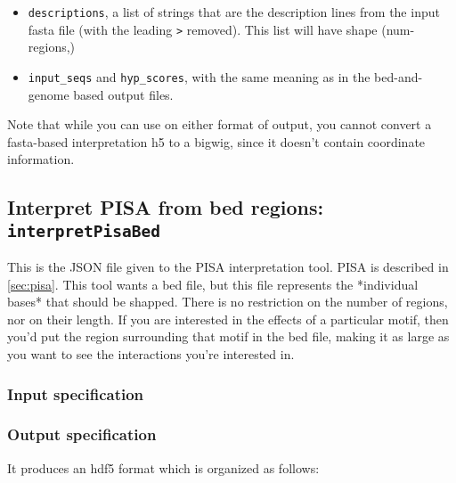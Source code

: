 \documentclass{article}
\begin{document}
\begin{itemize}
    \item \texttt{descriptions}, a list of strings that are the description
        lines from the input fasta file (with the leading \texttt{>} removed).
        This list will have shape (num-regions,)
    \item \texttt{input\_seqs} and \texttt{hyp\_scores}, with the same meaning
        as in the bed-and-genome based output files.
\end{itemize}

Note that while you can use  on either format of
 output, you cannot convert a fasta-based interpretation
h5 to a bigwig, since it doesn't contain coordinate information.


\newpage
\subsection{Interpret PISA from bed regions: \texttt{interpretPisaBed}}\label{prog:interpretPisaBed}

This is the JSON file given to the PISA interpretation tool. PISA is described
in \ref{sec:pisa}.
This tool wants a bed file, but this file represents the *individual bases* that
should be shapped.
There is no restriction on the number of regions, nor on their length.
If you are interested in the effects of a particular motif, then you'd put the
region surrounding that motif in the bed file, making it as large as you want
to see the interactions you're interested in.

\subsubsection{Input specification}



\subsubsection{Output specification}

It produces an hdf5 format which is organized as follows:
\end{document}

